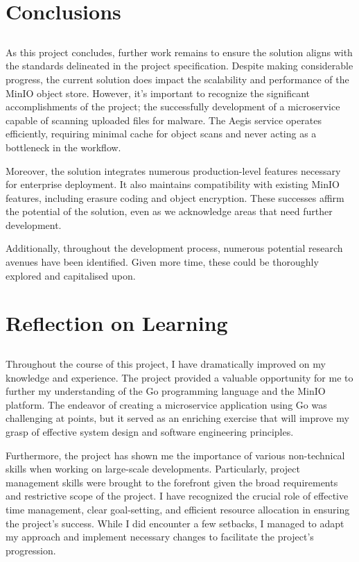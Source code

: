 \documentclass[12pt, conference, final, a4paper, onecolumn, compsoc]{IEEEtran}
\begin{document}
\section{Conclusions}
\subsection{}

As this project concludes, further work remains to ensure the solution aligns
with the standards delineated in the project specification. Despite making
considerable progress, the current solution does impact the scalability and
performance of the MinIO object store. However, it's important to recognize the
significant accomplishments of the project; the successfully development of a
microservice capable of scanning uploaded files for malware. The Aegis service
operates efficiently, requiring minimal cache for object scans and never acting
as a bottleneck in the workflow.

Moreover, the solution integrates numerous production-level features necessary
for enterprise deployment. It also maintains compatibility with existing MinIO
features, including erasure coding and object encryption. These successes affirm
the potential of the solution, even as we acknowledge areas that need further
development.

Additionally, throughout the development process, numerous potential research avenues have
been identified. Given more time, these could be thoroughly explored and
capitalised upon.

\section{Reflection on Learning}
\subsection{}

Throughout the course of this project, I have dramatically improved on my
knowledge and experience. The project provided a valuable opportunity for me to
further my understanding of the Go programming language and the MinIO platform.
The endeavor of creating a microservice application using Go was challenging at
points, but it served as an enriching exercise that will improve my grasp of
effective system design and software engineering principles.

Furthermore, the project has shown me the importance of various non-technical
skills when working on large-scale developments. Particularly, project
management skills were brought to the forefront given the broad requirements and
restrictive scope of the project. I have recognized the crucial role of
effective time management, clear goal-setting, and efficient resource allocation
in ensuring the project's success. While I did encounter a few setbacks, I
managed to adapt my approach and implement necessary changes to facilitate the
project's progression.
\end{document}
